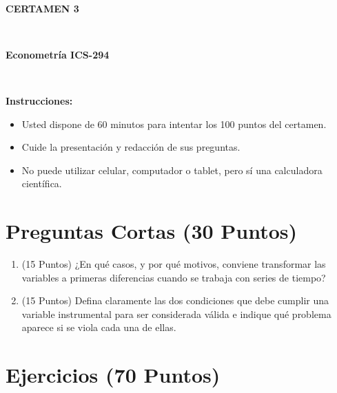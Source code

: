\documentclass[10pt,a4paper]{article}
\begin{document}
\vspace{5cm}



\begin{center}
\begin{large}
\textbf{\\CERTAMEN 3}
\end{large}\\
\end{center}

\begin{center}
\begin{large}
\textbf{Econometría ICS-294}
\end{large}\\
\vspace{0.2cm}

\end{center}

\textbf{Instrucciones:} 

\begin{itemize}

    \item Usted dispone de 60 minutos  para intentar los 100 puntos del certamen.
    \item Cuide la presentación y redacción de sus preguntas.
    \item No puede utilizar celular, computador o tablet, pero sí una calculadora científica.
     
\end{itemize}

\section{Preguntas Cortas (30 Puntos)}

\begin{enumerate}

\item (15 Puntos) ¿En qué casos, y por qué motivos, conviene transformar las variables a primeras diferencias cuando se trabaja con series de tiempo?

\item (15 Puntos) Defina claramente las dos condiciones que debe cumplir una variable instrumental para ser considerada válida e indique qué problema aparece si se viola cada una de ellas.  

\end{enumerate}

\section{Ejercicios (70 Puntos)}
\end{document}
